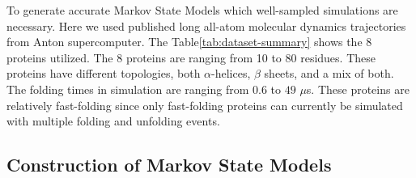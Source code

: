 To generate accurate Markov State Models which well-sampled simulations are necessary. Here we used published long all-atom molecular dynamics trajectories from Anton supercomputer\cite{lindorff2011}.
The Table\ref{tab:dataset-summary} shows the 8 proteins utilized. The 8 proteins are ranging from 10 to 80 residues. These proteins have different topologies, both $\alpha$-helices, $\beta$ sheets, and a mix of both. The folding times in simulation are ranging from $0.6$ to $49$ $\mu$s. These proteins are relatively fast-folding since only fast-folding proteins can currently be simulated with multiple folding and unfolding events.

\begin{table}[!ht]
\centering
\caption{Proteins for reference data}
\label{tab:dataset-summary}
\end{table}

\subsection{\label{sec:methods-msm}Construction of Markov State Models}

